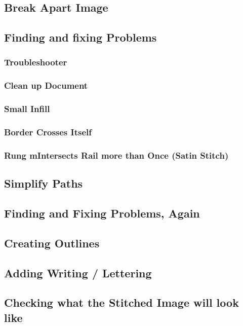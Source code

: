 \documentclass{article}
\begin{document}
        \subsection{Break Apart Image}

        \subsection{Finding and fixing Problems}
            \subsubsection{Troubleshooter}
            \subsubsection{Clean up Document}
            \subsubsection{Small Infill}
            \subsubsection{Border Crosses Itself}
            \subsubsection{Rung mIntersects Rail more than Once (Satin Stitch)}

        \subsection{Simplify Paths}
        
        \subsection{Finding and Fixing Problems, Again}

        \subsection{Creating Outlines}
        
        \subsection{Adding Writing / Lettering}

        \subsection{Checking what the Stitched Image will look like}
        
\end{document}
